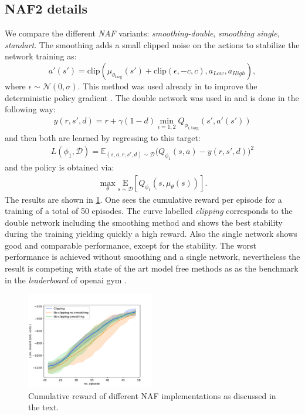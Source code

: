 \documentclass[
 reprint,
 amsmath,amssymb,amsfonts,clevref,
 aps,
prstab,
]{revtex4-2}
\begin{document}
\subsection{NAF2 details}\label{appendix:naf2}
 We compare the different \emph{NAF} variants: \emph{smoothing-double}, \emph{smoothing single}, \emph{standart}. The smoothing adds a small clipped noise on the actions to stabilize the network training as:
 \begin{equation}
 	a'(s') = \text{clip}\left(\mu_{\theta_{\text{targ}}}(s') + \text{clip}(\epsilon,-c,c), a_{Low}, a_{High}\right),
 \end{equation}
 	where $\epsilon \sim \mathcal{N}(0, \sigma)$. This method was used already in \cite{fujimoto2018addressing} to improve the deterministic policy gradient \cite{Silver2014}.
 The double network was used in \cite{fujimoto2018addressing,Haarnoja2018a} and is done in the following way:
 \begin{align}
y(r,s',d) = r + \gamma (1 - d) \min_{i=1,2} Q_{\phi_{i, \text{targ}}}(s', a'(s'))
 \end{align}
and then both are learned by regressing to this target:
\begin{align}
	L(\phi_1, {\mathcal D}) = \mathbb E_{(s,a,r,s',d) \sim {\mathcal D}}{
		\Bigg( Q_{\phi_1}(s,a) - y(r,s',d) \Bigg)^2
	}
\end{align}
and the policy is obtained via:
\begin{align}
\max_{\theta} \underset{s \sim {\mathcal D}}{{\mathrm E}}\left[ Q_{\phi_1}(s, \mu_{\theta}(s)) \right].
\end{align}
The results are shown in \cref{fig:comparsion_smoothing}. One sees the cumulative reward per episode for a training of a total of 50 episodes. The curve labelled \emph{clipping} corresponds to the double network including the smoothing method and shows the best stability during the training yielding quickly a high reward. Also the single network shows good and comparable performance, except for the stability. The worst performance is achieved without smoothing and a single network, nevertheless the result is competing with state of the art model free methods as \cite{BarthMaron2018} as the benchmark in the \emph{leaderboard} of openai gym \cite{Brockman2016}.
\begin{figure}[!h]
	\centering
	\includegraphics*[width=0.5\textwidth]{Figures/Comparison_smoothing}
	\caption{Cumulative reward of different NAF implementations as discussed in the text.}
	\label{fig:comparsion_smoothing}
\end{figure}
\end{document}
